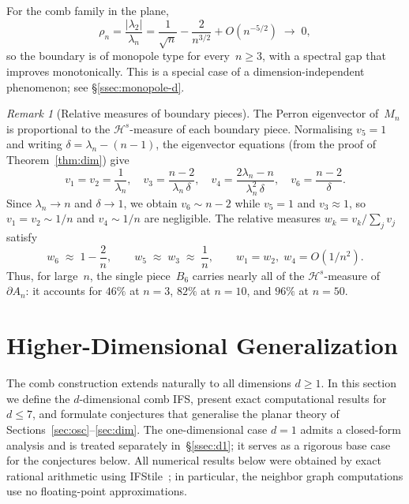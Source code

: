 \documentclass{amsart}
\theoremstyle{definition}
\theoremstyle{remark}
\newtheorem{remark}[theorem]{Remark}
\begin{document}
For the comb family in the plane,
\[
  \rho_n = \frac{|\lambda_2|}{\lambda_n}
         = \frac{1}{\sqrt{n}} - \frac{2}{n^{3/2}} + O(n^{-5/2})
         \;\longrightarrow\; 0,
\]
so the boundary is of monopole type for every~$n \ge 3$, with
a spectral gap that improves monotonically.  This is a special
case of a dimension-independent phenomenon; see
\S\ref{ssec:monopole-d}.

\begin{remark}[Relative measures of boundary pieces]
\label{rem:measures}
The Perron eigenvector of~$M_n$ is proportional to the
$\mathcal{H}^s$-measure of each boundary piece.
Normalising $v_5 = 1$ and writing $\delta = \lambda_n - (n{-}1)$,
the eigenvector equations (from the proof of
Theorem~\ref{thm:dim}) give
\[
  v_1 = v_2 = \frac{1}{\lambda_n},\quad
  v_3 = \frac{n{-}2}{\lambda_n\,\delta},\quad
  v_4 = \frac{2\lambda_n - n}{\lambda_n^2\,\delta},\quad
  v_6 = \frac{n{-}2}{\delta}.
\]
Since $\lambda_n \to n$ and $\delta \to 1$, we obtain
$v_6 \sim n{-}2$ while $v_5 = 1$ and
$v_3 \approx 1$,
so $v_1 = v_2 \sim 1/n$ and $v_4 \sim 1/n$ are negligible.
The relative measures
$w_k = v_k / \sum_j v_j$ satisfy
\[
  w_6 \;\approx\; 1 - \frac{2}{n}, \qquad
  w_5 \;\approx\; w_3 \;\approx\; \frac{1}{n}, \qquad
  w_1 = w_2,\; w_4 = O(1/n^2).
\]
Thus, for large~$n$, the single piece~$B_6$ carries nearly all of the
$\mathcal{H}^s$-measure of~$\partial A_n$: it accounts for $46\%$
at $n = 3$, $82\%$ at $n = 10$, and $96\%$ at $n = 50$.
\end{remark}

\section{Higher-Dimensional Generalization}
\label{sec:higherdim}

The comb construction extends naturally to all dimensions $d \ge 1$.
In this section we define the $d$-dimensional comb IFS, present exact
computational results for $d \le 7$, and formulate conjectures that
generalise the planar theory of
Sections~\ref{sec:osc}--\ref{sec:dim}.
The one-dimensional case $d = 1$ admits a closed-form analysis
and is treated separately in~\S\ref{ssec:d1};
it serves as a rigorous base case for the conjectures below.
All numerical results below were obtained by exact rational arithmetic
using IFStile~\cite{ifstile}; in particular, the neighbor graph
computations use no floating-point approximations.
\end{document}
